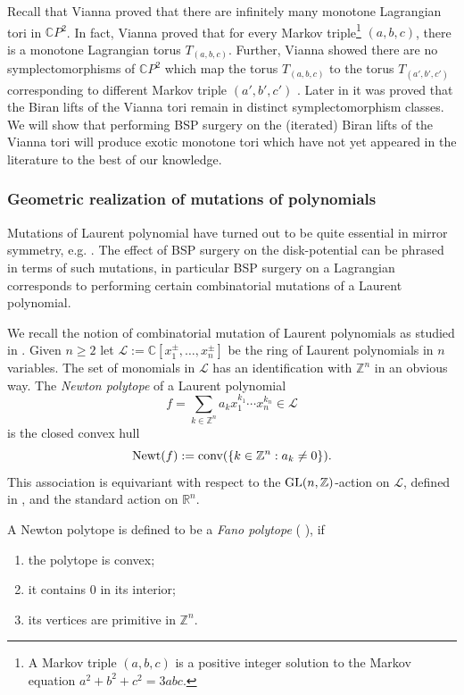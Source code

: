 \documentclass[11pt, oneside,dvipsnames]{amsart}
\newcommand{\<}{\langle}
\renewcommand{\>}{\rangle}
\newcommand{\bC}{\mathbb{C}}
\newcommand{\bR}{\mathbb{R}}
\newcommand{\bZ}{\mathbb{Z}}
\newcommand{\cL}{\mathcal{L}}
\newcommand{\s}[2]{\sum\limits_{#1}{#2} }
\DeclareMathOperator{\newt}{Newt}
\newcommand{\abc}{{(a,b,c)}}
\theoremstyle{definition}
\theoremstyle{definition}
\numberwithin{equation}{subsection}
\begin{document}
Recall that Vianna \cite{Via16,Via17} proved that there are infinitely many monotone Lagrangian tori in $\bC P^2$. In fact, Vianna proved that for every Markov triple\footnote{ A Markov triple $(a,b,c)$ is a positive integer solution to the Markov equation $a^2 + b^2 + c^2  = 3abc$.}  $(a,b,c)$, there is a monotone Lagrangian torus $T_\abc$.  Further, Vianna showed there are no symplectomorphisms of $\bC P^2$ which map the torus $T_\abc$ to the torus $T_{(a',b',c')}$ corresponding to different Markov triple $(a',b',c')$ .  Later in \cite{DTVW,chw} it was proved that the Biran lifts of the Vianna tori remain in distinct symplectomorphism classes. We will show that performing BSP surgery on the (iterated) Biran lifts of the Vianna tori will produce exotic monotone tori which have not yet appeared in the literature to the best of our knowledge.

\subsubsection{Geometric realization of mutations of polynomials}\label{subsec:geomrel}

Mutations of Laurent polynomial have turned out to be quite essential in mirror symmetry,  e.g. \cite{cruzgalkin,21coates,minksum}. The effect of BSP surgery on the disk-potential can be phrased in terms of such mutations, in particular BSP surgery on a Lagrangian corresponds  to performing certain combinatorial mutations of a Laurent polynomial.   

We recall the notion of combinatorial mutation of Laurent polynomials as studied in \cite{21coates}.
Given $n \geq 2$ let $\cL:= \bC[x_1^\pm,\dots,x_n^\pm]$ be the ring of Laurent polynomials in $n$ variables. The set of monomials in $\cL$ has an identification with $\bZ^n$ in an obvious way. The \emph{Newton polytope} of a Laurent polynomial $$f = \s{k\in \bZ^n}{a_kx_1^{k_1}\cdots x_n^{k_n}}\in \cL$$  is the closed convex hull
$$\newt(f) := \normalfont\text{conv}(\{k \in \bZ^n : a_k \neq 0\}).$$
This association is equivariant with respect to the $\normalfont\text{GL}(n,\bZ)$-action on $\cL$, defined in \cite[Remark 4.2]{PT20}, and the standard action on $\bR^n$. 

\noindent A Newton polytope  is defined to be a \textit{Fano polytope} ( \cite{minksum} ), if
\begin{enumerate}
    \item the polytope is convex;
    \item it contains $0$ in its interior;
    \item its vertices are primitive in $\bZ^n$.
\end{enumerate}
\end{document}
